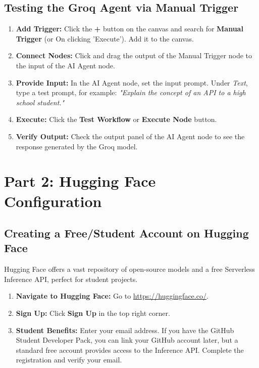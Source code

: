 \documentclass[12pt,a4paper]{article}
\begin{document}
\subsection{Testing the Groq Agent via Manual Trigger}
\begin{enumerate}[label=\textbf{Step \arabic*.}]
    \item \textbf{Add Trigger:} Click the \textbf{+} button on the canvas and search for \textbf{Manual Trigger} (or On clicking 'Execute'). Add it to the canvas.
    \item \textbf{Connect Nodes:} Click and drag the output of the Manual Trigger node to the input of the AI Agent node.
    \item \textbf{Provide Input:} In the AI Agent node, set the input prompt. Under \textit{Text}, type a test prompt, for example: \textit{"Explain the concept of an API to a high school student."}
    \item \textbf{Execute:} Click the \textbf{Test Workflow} or \textbf{Execute Node} button.
    \item \textbf{Verify Output:} Check the output panel of the AI Agent node to see the response generated by the Groq model.
\end{enumerate}

\newpage

\section{Part 2: Hugging Face Configuration}

\subsection{Creating a Free/Student Account on Hugging Face}
Hugging Face offers a vast repository of open-source models and a free Serverless Inference API, perfect for student projects.

\begin{enumerate}[label=\textbf{Step \arabic*.}]
    \item \textbf{Navigate to Hugging Face:} Go to \url{https://huggingface.co/}.
    \item \textbf{Sign Up:} Click \textbf{Sign Up} in the top right corner. 
    \item \textbf{Student Benefits:} Enter your email address. If you have the GitHub Student Developer Pack, you can link your GitHub account later, but a standard free account provides access to the Inference API. Complete the registration and verify your email.
\end{enumerate}
\end{document}
